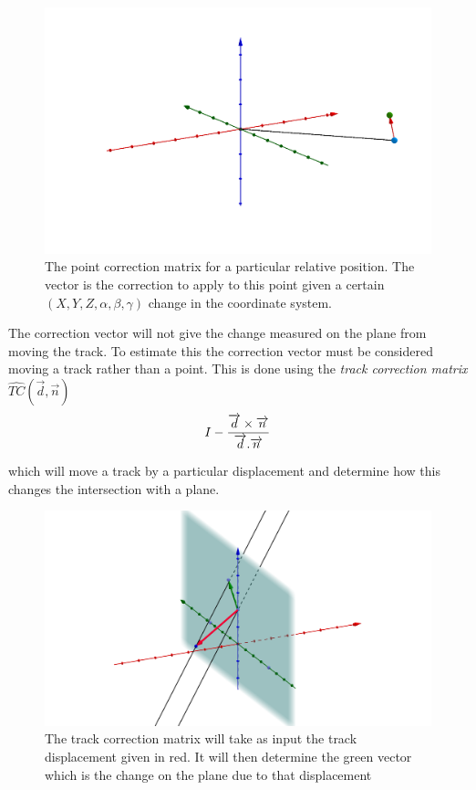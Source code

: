 \begin{figure}[H]
\centering
\includegraphics[width=1.0\linewidth]{figures/corrAlign.png}
\caption{The point correction matrix for a particular relative position. The vector is the correction to apply to this point given a certain $(X,Y,Z, \alpha,\beta,\gamma)$ change in the coordinate system.}
\label{fig:CorrMatrix}
\end{figure}

The correction vector will not give the change measured on the plane from moving the track. To estimate this the correction vector must be considered moving a track rather than a point. This is done using the \emph{track correction matrix} $\hat{TC}(\overrightarrow d, \overrightarrow n )$ 
\begin{equation}
  I -  \frac{\overrightarrow d \times \overrightarrow n}{\overrightarrow d . \overrightarrow n}\\
  \label{eq:TC}
\end{equation}

which will move a track by a particular displacement and determine how this changes the intersection with a plane. 

\begin{figure}[H]
\centering
\includegraphics[width=1.0\linewidth]{figures/alignBigger.png}
\caption{The track correction matrix will take as input the track displacement given in red. It will then determine the green vector which is the change on the plane due to that displacement}
\label{fig:TC1}
\end{figure}

